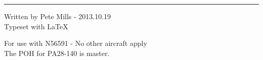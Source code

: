 \documentclass[8pt]{article}
\newenvironment{enumerate*}%
               {\begin{enumerate}%
                   \setlength{\itemsep}{0pt}%
                   \setlength{\parskip}{0pt}}%
               {\end{enumerate}}
\begin{document}
\begin{multicols}{2}
\begin{enumerate*}
	\end{enumerate*}


\rule{0.5\linewidth}{0.25pt}
\scriptsize

Written by Pete Mills - 2013.10.19\\
Typeset with \LaTeX\ 

For use with N56591 - No other aircraft apply\\
The POH for PA28-140 is master.


\end{multicols}
\end{document}
